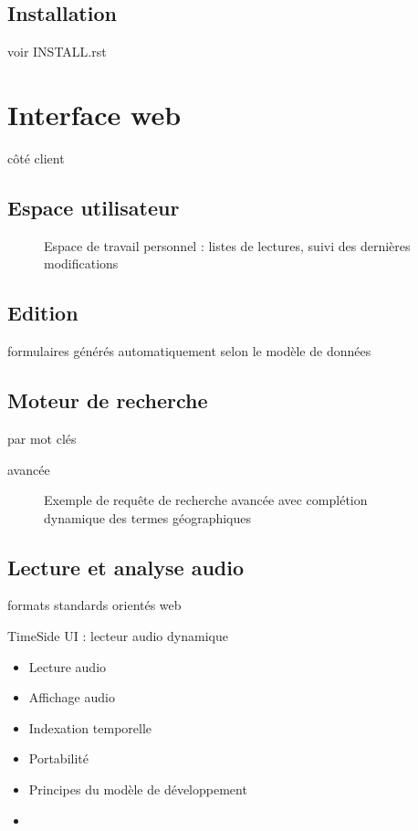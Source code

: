 \documentclass[a4paper,11pt,french]{article}
\begin{document}
\subsection{Installation}

voir INSTALL.rst


\section{Interface web}

côté client

\subsection{Espace utilisateur}


\begin{figure}[htp]
    \centering
    \caption{Espace de travail personnel : listes de lectures, suivi des dernières modifications}
    \label{index1}
\end{figure}


\subsection{Edition}

formulaires générés automatiquement selon le modèle de données

\subsection{Moteur de recherche}

par mot clés

avancée


\begin{figure}[htp]
    \centering
    \caption{Exemple de requête de recherche avancée avec complétion dynamique des termes géographiques}
    \label{search1}
\end{figure}


\subsection{Lecture et analyse audio}

formats standards orientés web

TimeSide UI : lecteur audio dynamique
\begin{itemize}
\item Lecture audio
\item Affichage audio
\item Indexation temporelle
\item Portabilité
\item Principes du modèle de développement
\item {}
\end{itemize}
\end{document}
